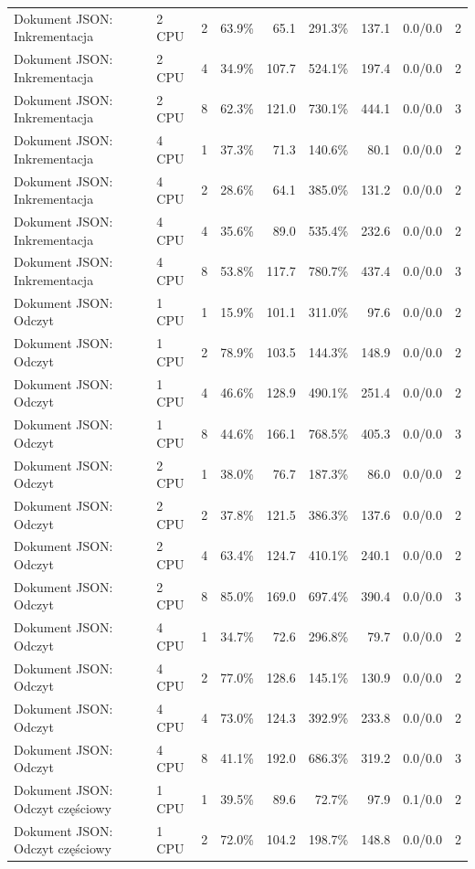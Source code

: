 \begin{table}[ht]
{\begin{tabular}{llcrrrrcc}
Dokument JSON: Inkrementacja & 2 CPU & 2 & 63.9\% & 65.1 & 291.3\% & 137.1 & 0.0/0.0 & 2 \\
Dokument JSON: Inkrementacja & 2 CPU & 4 & 34.9\% & 107.7 & 524.1\% & 197.4 & 0.0/0.0 & 2 \\
Dokument JSON: Inkrementacja & 2 CPU & 8 & 62.3\% & 121.0 & 730.1\% & 444.1 & 0.0/0.0 & 3 \\
Dokument JSON: Inkrementacja & 4 CPU & 1 & 37.3\% & 71.3 & 140.6\% & 80.1 & 0.0/0.0 & 2 \\
Dokument JSON: Inkrementacja & 4 CPU & 2 & 28.6\% & 64.1 & 385.0\% & 131.2 & 0.0/0.0 & 2 \\
Dokument JSON: Inkrementacja & 4 CPU & 4 & 35.6\% & 89.0 & 535.4\% & 232.6 & 0.0/0.0 & 2 \\
Dokument JSON: Inkrementacja & 4 CPU & 8 & 53.8\% & 117.7 & 780.7\% & 437.4 & 0.0/0.0 & 3 \\
Dokument JSON: Odczyt & 1 CPU & 1 & 15.9\% & 101.1 & 311.0\% & 97.6 & 0.0/0.0 & 2 \\
Dokument JSON: Odczyt & 1 CPU & 2 & 78.9\% & 103.5 & 144.3\% & 148.9 & 0.0/0.0 & 2 \\
Dokument JSON: Odczyt & 1 CPU & 4 & 46.6\% & 128.9 & 490.1\% & 251.4 & 0.0/0.0 & 2 \\
Dokument JSON: Odczyt & 1 CPU & 8 & 44.6\% & 166.1 & 768.5\% & 405.3 & 0.0/0.0 & 3 \\
Dokument JSON: Odczyt & 2 CPU & 1 & 38.0\% & 76.7 & 187.3\% & 86.0 & 0.0/0.0 & 2 \\
Dokument JSON: Odczyt & 2 CPU & 2 & 37.8\% & 121.5 & 386.3\% & 137.6 & 0.0/0.0 & 2 \\
Dokument JSON: Odczyt & 2 CPU & 4 & 63.4\% & 124.7 & 410.1\% & 240.1 & 0.0/0.0 & 2 \\
Dokument JSON: Odczyt & 2 CPU & 8 & 85.0\% & 169.0 & 697.4\% & 390.4 & 0.0/0.0 & 3 \\
Dokument JSON: Odczyt & 4 CPU & 1 & 34.7\% & 72.6 & 296.8\% & 79.7 & 0.0/0.0 & 2 \\
Dokument JSON: Odczyt & 4 CPU & 2 & 77.0\% & 128.6 & 145.1\% & 130.9 & 0.0/0.0 & 2 \\
Dokument JSON: Odczyt & 4 CPU & 4 & 73.0\% & 124.3 & 392.9\% & 233.8 & 0.0/0.0 & 2 \\
Dokument JSON: Odczyt & 4 CPU & 8 & 41.1\% & 192.0 & 686.3\% & 319.2 & 0.0/0.0 & 3 \\
Dokument JSON: Odczyt częściowy & 1 CPU & 1 & 39.5\% & 89.6 & 72.7\% & 97.9 & 0.1/0.0 & 2 \\
Dokument JSON: Odczyt częściowy & 1 CPU & 2 & 72.0\% & 104.2 & 198.7\% & 148.8 & 0.0/0.0 & 2 \\

\end{tabular}}
\end{table}
